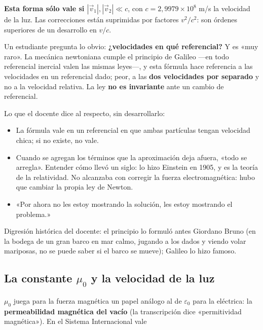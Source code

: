 \documentclass[12pt,a4paper]{article}
\begin{document}
\begin{warnbox}
\textbf{Esta forma sólo vale si $|\vec v_1|, |\vec v_2| \ll c$}, con
$c = 2{,}9979\times10^{8}$ m/s la velocidad de la luz. Las correcciones están
suprimidas por factores $v^2/c^2$: son órdenes superiores de un desarrollo en
$v/c$.
\end{warnbox}

Un estudiante pregunta lo obvio: \textbf{¿velocidades en qué referencial?} Y es «muy
raro». La mecánica newtoniana cumple el principio de Galileo ---en todo
referencial inercial valen las mismas leyes---, y esta fórmula hace referencia a
las velocidades en un referencial dado; peor, a las \textbf{dos velocidades por
separado} y no a la velocidad relativa. La ley \textbf{no es invariante} ante un
cambio de referencial.

Lo que el docente dice al respecto, sin desarrollarlo:

\begin{itemize}
  \item La fórmula vale en un referencial en que ambas partículas tengan velocidad
  chica; si no existe, no vale.
  \item Cuando se agregan los términos que la aproximación deja afuera, «todo se
  arregla». Entender cómo llevó un siglo: lo hizo Einstein en 1905, y es la
  teoría de la relatividad. No alcanzaba con corregir la fuerza
  electromagnética: hubo que cambiar la propia ley de Newton.
  \item «Por ahora no les estoy mostrando la solución, les estoy mostrando el
  problema.»
\end{itemize}

\begin{notebox}
Digresión histórica del docente: el principio lo formuló antes Giordano Bruno
(en la bodega de un gran barco en mar calmo, jugando a los dados y viendo
volar mariposas, no se puede saber si el barco se mueve); Galileo lo hizo
famoso.
\end{notebox}

\subsection{La constante \texorpdfstring{$\mu_0$}{mu0} y la velocidad de la luz}

$\mu_0$ juega para la fuerza magnética un papel análogo al de $\varepsilon_0$
para la eléctrica: la \textbf{permeabilidad magnética del vacío} (la transcripción
dice «permitividad magnética»). En el Sistema Internacional vale
\end{document}
